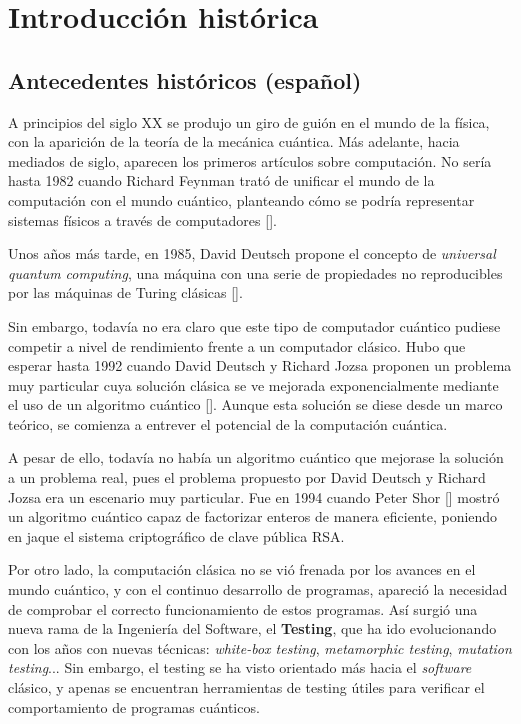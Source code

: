 \chapter{Introducción histórica}

\section{Antecedentes históricos (español)}
A principios del siglo XX se produjo un giro de guión en el mundo de la física, con la aparición de la teoría de la mecánica cuántica. Más adelante, hacia mediados de siglo, aparecen los primeros artículos sobre computación. No sería hasta 1982 cuando Richard Feynman trató de unificar el mundo de la computación con el mundo cuántico, planteando cómo se podría representar sistemas físicos a través de computadores [\cite{feynman1982simulating}].

Unos años más tarde, en 1985, David Deutsch propone el concepto de \textit{universal quantum computing}, una máquina con una serie de propiedades no reproducibles por las máquinas de Turing clásicas [\cite{deutsch1985quantum}].

Sin embargo, todavía no era claro que este tipo de computador cuántico pudiese competir a nivel de rendimiento frente a un computador clásico. Hubo que esperar hasta 1992 cuando David Deutsch y Richard Jozsa proponen un problema muy particular cuya solución clásica se ve mejorada exponencialmente mediante el uso de un algoritmo cuántico [\cite{deutsch1992rapid}]. Aunque esta solución se diese desde un marco teórico, se comienza a entrever el potencial de la computación cuántica.

A pesar de ello, todavía no había un algoritmo cuántico que mejorase la solución a un problema real, pues el problema propuesto por David Deutsch y Richard Jozsa era un escenario muy particular. Fue en 1994 cuando Peter Shor [\cite{shor1994algorithms}] mostró un algoritmo cuántico capaz de factorizar enteros de manera eficiente, poniendo en jaque el sistema criptográfico de clave pública RSA.

Por otro lado, la computación clásica no se vió frenada por los avances en el mundo cuántico, y con el continuo desarrollo de programas, apareció la necesidad de comprobar el correcto funcionamiento de estos programas. Así surgió una nueva rama de la Ingeniería del Software, el \textbf{Testing}, que ha ido evolucionando con los años con nuevas técnicas: \textit{white-box testing}, \textit{metamorphic testing}, \textit{mutation testing}... Sin embargo, el testing se ha visto orientado más hacia el \textit{software} clásico, y apenas se encuentran herramientas de testing útiles para verificar el comportamiento de programas cuánticos. 

